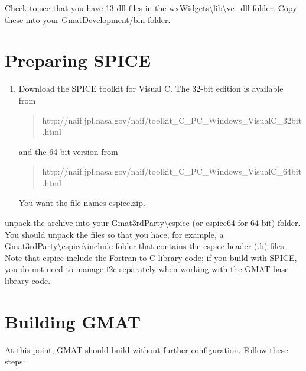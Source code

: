 \documentclass[letterpaper,10pt]{article}%
\begin{document}
\noindent Check to see that you have 13 dll files in the wxWidgets\textbackslash lib\textbackslash vc\_dll folder.  Copy these into your GmatDevelopment/bin folder.

\section{Preparing SPICE}

\begin{enumerate}
\item Download the SPICE toolkit for Visual C.  The 32-bit edition is available from
\begin{quote}
http://naif.jpl.nasa.gov/naif/toolkit_C_PC_Windows_VisualC_32bit.html
\end{quote}
\noindent and the 64-bit version from
\begin{quote}
http://naif.jpl.nasa.gov/naif/toolkit_C_PC_Windows_VisualC_64bit.html
\end{quote}
\noindent You want the file names cspice.zip.
\end{enumerate}
\item unpack the archive into your Gmat3rdParty\textbackslash cspice (or cspice64 for 64-bit) folder.  You should unpack the files so that you hace, for example, a Gmat3rdParty\textbackslash cspice\textbackslash include folder that contains the cspice header (.h) files.  Note that cspice include the Fortran to C library code; if you build with SPICE, you do not need to manage f2c separately when working with the GMAT base library code.

\section{Building GMAT}

At this point, GMAT should build without further configuration.  Follow these steps:
\end{document}
